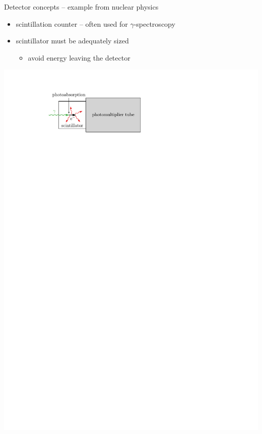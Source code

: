 \documentclass[11pt,xcolor=dvipsnames,professionalfonts]{beamer}
\begin{document}
\begin{frame}{Detector concepts -- example from nuclear physics}
	\begin{itemize}
		\setlength\itemsep{1.5em}
		\item scintillation counter -- often used for $\gamma$-spectroscopy
		
		\item scintillator must be adequately sized
		\begin{itemize}
			\item avoid energy leaving the detector
		\end{itemize}
	\end{itemize}
	\vfill
	\begin{center}
		\includegraphics{./figures/scintillation_counter.pdf}
	\end{center}
\end{frame}
\end{document}
